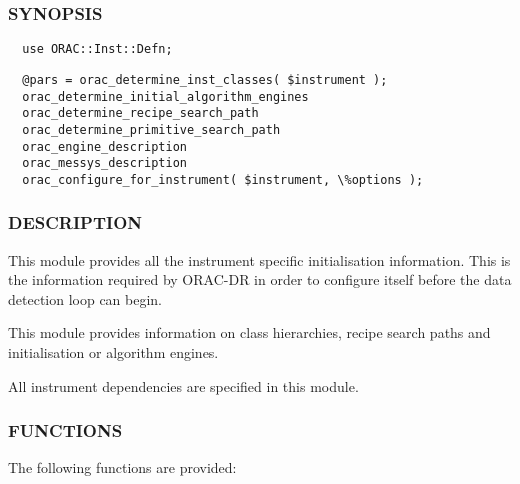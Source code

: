 \subsubsection*{SYNOPSIS\label{ORAC::Inst::Defn_SYNOPSIS}}\begin{verbatim}
  use ORAC::Inst::Defn;
\end{verbatim}
\begin{verbatim}
  @pars = orac_determine_inst_classes( $instrument );
  orac_determine_initial_algorithm_engines
  orac_determine_recipe_search_path
  orac_determine_primitive_search_path
  orac_engine_description
  orac_messys_description
  orac_configure_for_instrument( $instrument, \%options );
\end{verbatim}
\subsubsection*{DESCRIPTION\label{ORAC::Inst::Defn_DESCRIPTION}}

This module provides all the instrument specific initialisation
information. This is the information required by ORAC-DR in order
to configure itself before the data detection loop can begin.



This module provides information on class hierarchies, recipe
search paths and initialisation or algorithm engines.



All instrument dependencies are specified in this module.

\subsubsection*{FUNCTIONS\label{ORAC::Inst::Defn_FUNCTIONS}}

The following functions are provided:

